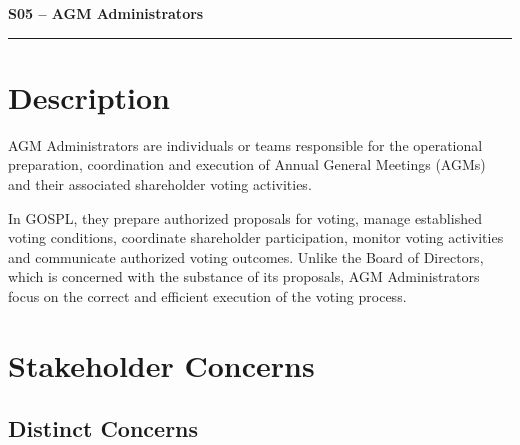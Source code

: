 \documentclass[11pt,a4paper]{article}
\begin{document}

{\LARGE\bfseries S05 -- AGM Administrators\par}\vspace{1em}
\noindent\rule{\linewidth}{0.4pt}

\section*{Description}

AGM Administrators are individuals or teams responsible for the operational preparation, coordination and execution of Annual General Meetings (AGMs) and their associated shareholder voting activities.

In GOSPL, they prepare authorized proposals for voting, manage established voting conditions, coordinate shareholder participation, monitor voting activities and communicate authorized voting outcomes. Unlike the Board of Directors, which is concerned with the substance of its proposals, AGM Administrators focus on the correct and efficient execution of the voting process.

\section*{Stakeholder Concerns}

\subsection*{Distinct Concerns}
\end{document}
